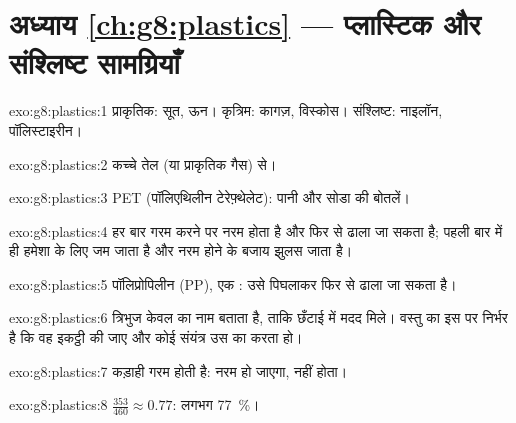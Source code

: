 \section*{अध्याय \ref{ch:g8:plastics} --- प्लास्टिक और संश्लिष्ट सामग्रियाँ}

\begin{solution}{exo:g8:plastics:1}
प्राकृतिक: सूत, ऊन। कृत्रिम: कागज़, विस्कोस। संश्लिष्ट: नाइलॉन,
पॉलिस्टाइरीन।
\end{solution}

\begin{solution}{exo:g8:plastics:2}
कच्चे तेल (या प्राकृतिक गैस) से।
\end{solution}

\begin{solution}{exo:g8:plastics:3}
PET (पॉलिएथिलीन टेरेफ़्थेलेट): पानी और सोडा की बोतलें।
\end{solution}

\begin{solution}{exo:g8:plastics:4}
 हर बार गरम करने पर नरम होता है और फिर से ढाला जा सकता है;
 पहली बार में ही हमेशा के लिए जम जाता है और नरम होने के बजाय झुलस जाता है।
\end{solution}

\begin{solution}{exo:g8:plastics:5}
पॉलिप्रोपिलीन (PP), एक : उसे पिघलाकर फिर से ढाला जा सकता है।
\end{solution}

\begin{solution}{exo:g8:plastics:6}
त्रिभुज केवल  का नाम बताता है, ताकि छँटाई में मदद मिले। वस्तु का
 इस पर निर्भर है कि वह इकट्ठी की जाए और कोई संयंत्र उस 
का  करता हो।
\end{solution}

\begin{solution}{exo:g8:plastics:7}
कड़ाही गरम होती है:  नरम हो जाएगा,  नहीं होता।
\end{solution}

\begin{solution}{exo:g8:plastics:8}
$\frac{353}{460} \approx 0.77$: लगभग \qty{77}{\percent}।
\end{solution}

